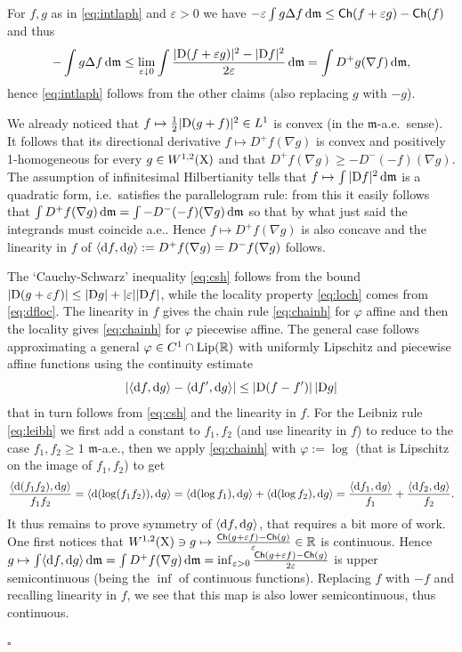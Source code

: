\documentclass[11pt]{article}
\numberwithin{equation}{section}
\newenvironment{idea}{\removelastskip\par\medskip   %
\noindent{\em Idea of the proof} \rm}{\penalty-20\null\hfill$\square$\par\medbreak}
\newcommand{\R}{\mathbb{R}}
\newcommand{\X}{{\rm X}}
\newcommand{\mm}{{\mathfrak m}}
\newcommand{\ch}{{\sf Ch}}
\renewcommand{\d}{{\rm d}}
\newcommand{\D}{{\rm D}}
\newcommand{\Lip}{{\rm Lip}}
\newcommand{\eps}{\varepsilon}
\newcommand\la{\langle}
\newcommand\ra{\rangle}
\begin{document}
\begin{idea} For $f,g$ as in \eqref{eq:intlaph} and $\eps>0$ we have $-\eps\int g\Delta f\,\d\mm\leq {\ch(f+\eps g)-\ch(f)}$ and thus
\[
-\int g\Delta f\,\d\mm\leq\lim_{\eps\downarrow0}\int \frac{|\D (f+\eps g)|^2-|\D f|^2}{2\eps}\,\d\mm=\int D^+g(\nabla f)\,\d\mm,
\]
hence \eqref{eq:intlaph} follows from the other claims (also replacing $g$ with $-g$). 


We already noticed that $f\mapsto \tfrac12|\D(g+f)|^2\in L^1$ is convex (in the $\mm$-a.e.\ sense). It follows that its directional derivative $f\mapsto D^+f(\nabla g)$ is convex and positively 1-homogeneous for every $g\in W^{1,2}(\X)$ and that  $D^+f(\nabla g)\geq - D^-(-f)(\nabla g)$. The assumption of infinitesimal Hilbertianity tells that $f\mapsto \int |\D f|^2\,\d\mm$ is a quadratic form, i.e.\ satisfies the parallelogram rule: from this it easily follows that $\int D^+f(\nabla g)\,\d\mm=\int - D^-(-f)(\nabla g)\,\d\mm$ so that by what just said the integrands must coincide a.e.. Hence $f\mapsto D^+f(\nabla g)$ is also concave and  the linearity in $f$ of $\la \d f,\d g\ra:=D^+f(\nabla g)=D^-f(\nabla g)$ follows.

The `Cauchy-Schwarz' inequality \eqref{eq:csh} follows from the bound $|\D(g+\eps f)|\leq |\D g|+|\eps||\D f|$, while the locality property \eqref{eq:loch} comes  from \eqref{eq:dfloc}. The linearity in $f$ gives the chain rule \eqref{eq:chainh}  for $\varphi$ affine  and then the locality gives \eqref{eq:chainh} for $\varphi$ piecewise affine. The general case follows  approximating a general $\varphi\in C^1\cap\Lip(\R)$ with uniformly Lipschitz and piecewise affine functions using the continuity estimate 
\[
|\la\d f,\d g\ra-\la\d f',\d g\ra|\leq |\D(f-f')|\,|\D g|
\]
that in turn follows from \eqref{eq:csh} and the linearity in $f$. For the Leibniz rule \eqref{eq:leibh} we first add a constant to $f_1,f_2$ (and use linearity in $f$) to reduce to the case  $f_1,f_2\geq 1$ $\mm$-a.e., then we apply \eqref{eq:chainh} with $\varphi:=\log$ (that is Lipschitz on the image of $f_1,f_2$) to get
\[
\begin{split}
\frac{\la\d(f_1f_2),\d g\ra}{f_1f_2}=\la\d(\log(f_1f_2)),\d g\ra=\la\d(\log f_1),\d g\ra+\la\d(\log f_2),\d g\ra=\frac{\la\d f_1,\d g\ra}{f_1}+\frac{\la\d f_2,\d g\ra}{f_2}.
\end{split}
\]
It thus remains to prove symmetry of $\la\d f,\d g\ra$, that  requires a bit more of work. One first notices that $W^{1,2}(\X)\ni g\mapsto \frac{\ch(g+\eps f)-\ch(g)}{\eps}\in \R$ is continuous. Hence $g\mapsto \int \la\d f,\d g\ra\,\d\mm=\int D^+f(\nabla g)\,\d\mm=\inf_{\eps>0}\frac{\ch(g+\eps f)-\ch(g)}{2\eps}$ is upper semicontinuous (being the $\inf$ of continuous functions). Replacing $f$ with $-f$ and recalling linearity in $f$, we see that this map is also lower semicontinuous, thus continuous. 


\end{idea}
\end{document}
